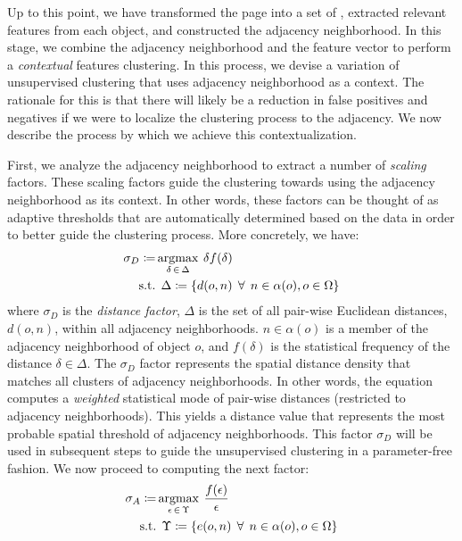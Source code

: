 Up to this point, we have
transformed the page into a set of {\vizobjs},
extracted relevant features from each object,
and constructed the adjacency neighborhood.
In this stage, we combine the adjacency neighborhood and
the feature vector to perform a \emph{contextual} features clustering.
In this process, we devise a variation of unsupervised clustering
that uses adjacency neighborhood as a context.
The rationale for this is that there will likely be a reduction in 
false positives and negatives if we were to localize the clustering
process to the adjacency.
We now describe the process by which we achieve this contextualization.

First, we analyze the adjacency neighborhood to extract a number of
\emph{scaling} factors.
These scaling factors guide the clustering towards using
the adjacency neighborhood as its context.
In other words, these factors can be thought of as adaptive thresholds 
that are automatically determined based on the data in order to 
better guide the clustering process.
More concretely, we have:
\begin{align}
    \sigma_D \coloneqq &\operatorname*{argmax}_{\delta \,\in\, \Delta} \: \delta f(\delta) \\
    \mathrm{s.t.}& \:\: \Delta \coloneqq \{ d(o, n) \:\:\forall\:\: n \in \alpha(o), o \in \Omega\} \nonumber
\end{align}
where $\sigma_D$ is the \emph{distance factor},
$\Delta$ is the set of all pair-wise Euclidean distances, $d(o, n)$,
within all adjacency neighborhoods.
$n \in \alpha(o)$ is a member of the adjacency neighborhood of object $o$,
and $f(\delta)$ is the statistical frequency of the distance $\delta \in \Delta$.
The $\sigma_D$ factor represents the spatial distance density that matches
all clusters of adjacency neighborhoods.
In other words, the equation computes a \emph{weighted} statistical mode 
of pair-wise distances (restricted to adjacency neighborhoods).
This yields a distance value that represents 
the most probable spatial threshold of adjacency neighborhoods.
This factor $\sigma_D$ will be used in subsequent steps to guide the unsupervised clustering
in a parameter-free fashion. We now proceed to computing the next factor:
\begin{align}
    \sigma_A \coloneqq &\operatorname*{argmax}_{\epsilon \,\in\, \Upsilon} \: \frac{f(\epsilon)}{\epsilon} \\
    \mathrm{s.t.}& \:\: \Upsilon \coloneqq \{ e(o, n) \:\:\forall\:\: n \in \alpha(o), o \in \Omega\} \nonumber
\end{align}
